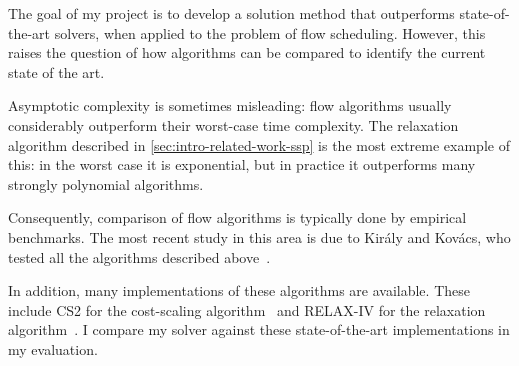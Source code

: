 The goal of my project is to develop a solution method that outperforms state-of-the-art solvers, when applied to the problem of flow scheduling. However, this raises the question of how algorithms can be compared to identify the current state of the art.

Asymptotic complexity is sometimes misleading: flow algorithms usually considerably outperform their worst-case time complexity. The relaxation algorithm described in \cref{sec:intro-related-work-ssp} is the most extreme example of this: in the worst case it is exponential, but in practice it outperforms many strongly polynomial algorithms.

Consequently, comparison of flow algorithms is typically done by empirical benchmarks. The most recent study in this area is due to Kir{\'{a}}ly and Kov{\'{a}}cs, who tested all the algorithms described above~\cite{KiralyKovacs:2012,Kovacs:2015}.

In addition, many implementations of these algorithms are available. These include CS2 for the cost-scaling algorithm~\cite{CS2:2009} and RELAX-IV for the relaxation algorithm~\cite{RelaxIV:2011}. I compare my solver against these state-of-the-art implementations in my evaluation.